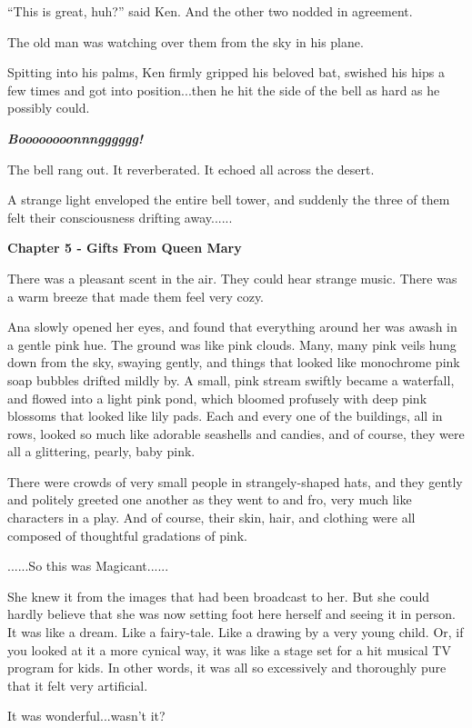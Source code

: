 \documentclass[
]{article}
\begin{document}
``This is great, huh?'' said Ken. And the other two nodded in agreement.

The old man was watching over them from the sky in his plane.

Spitting into his palms, Ken firmly gripped his beloved bat, swished his
hips a few times and got into position...then he hit the side of the
bell as hard as he possibly could.

\emph{\textbf{Boooooooonnngggggg!}}

The bell rang out. It reverberated. It echoed all across the desert.

A strange light enveloped the entire bell tower, and suddenly the three
of them felt their consciousness drifting away......

\textbf{Chapter 5 - Gifts From Queen Mary}

There was a pleasant scent in the air. They could hear strange music.
There was a warm breeze that made them feel very cozy.

Ana slowly opened her eyes, and found that everything around her was
awash in a gentle pink hue. The ground was like pink clouds. Many, many
pink veils hung down from the sky, swaying gently, and things that
looked like monochrome pink soap bubbles drifted mildly by. A small,
pink stream swiftly became a waterfall, and flowed into a light pink
pond, which bloomed profusely with deep pink blossoms that looked like
lily pads. Each and every one of the buildings, all in rows, looked so
much like adorable seashells and candies, and of course, they were all a
glittering, pearly, baby pink.

There were crowds of very small people in strangely-shaped hats, and
they gently and politely greeted one another as they went to and fro,
very much like characters in a play. And of course, their skin, hair,
and clothing were all composed of thoughtful gradations of pink.

......So this was Magicant......

She knew it from the images that had been broadcast to her. But she
could hardly believe that she was now setting foot here herself and
seeing it in person. It was like a dream. Like a fairy-tale. Like a
drawing by a very young child. Or, if you looked at it a more cynical
way, it was like a stage set for a hit musical TV program for kids. In
other words, it was all so excessively and thoroughly pure that it felt
very artificial.

It was wonderful...wasn't it?
\end{document}
